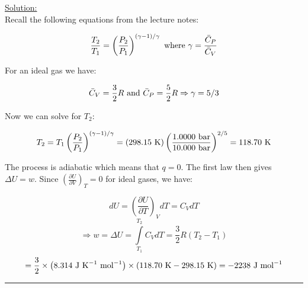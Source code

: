 \noindent
\underline{Solution:}\\

Recall the following equations from the lecture notes:

$$\frac{T_2}{T_1} = \left(\frac{P_2}{P_1}\right)^{(\gamma - 1)/\gamma}\textnormal{ where }\gamma = \frac{\bar{C}_P}{\bar{C}_V}$$

For an ideal gas we have:

$$\bar{C}_V = \frac{3}{2}R\textnormal{ and }\bar{C}_P = \frac{5}{2}R \Rightarrow \gamma = 5/3$$

Now we can solve for $T_2$:

$$T_2 = T_1 \left(\frac{P_2}{P_1}\right)^{(\gamma - 1)/\gamma} = (298.15\textnormal{ K})\left(\frac{1.0000\textnormal{ bar}}{10.000\textnormal{ bar}}\right)^{2/5} = 118.70\textnormal{ K}$$

The process is adiabatic which means that $q = 0$. The first law then gives $\Delta U = w$. Since $\left(\frac{\partial U}{\partial V}\right)_T = 0$ for ideal gases, we have:

$$dU = \left(\frac{\partial U}{\partial T}\right)_V dT = C_VdT$$
$$\Rightarrow w = \Delta U = \int\limits_{T_1}^{T_2} C_VdT = \frac{3}{2}R\left(T_2 - T_1\right)$$
$$= \frac{3}{2}\times\left(8.314\textnormal{ J K}^{-1}\textnormal{ mol}^{-1}\right)\times\left(118.70\textnormal{ K} - 298.15\textnormal{ K}\right) = -2238\textnormal{ J mol}^{-1}$$

\hrule\vspace{0.5cm}
